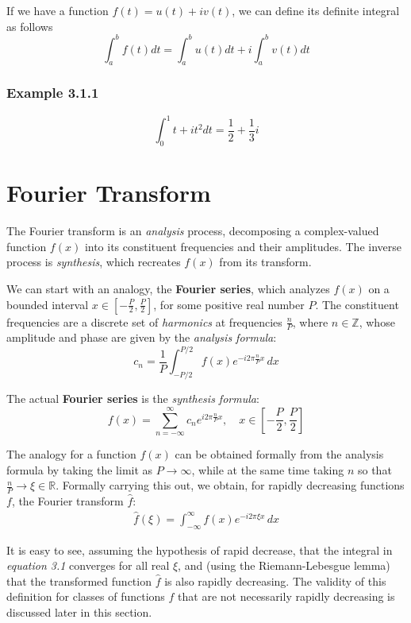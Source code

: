 \documentclass[12pt]{book}
\begin{document}
If we have a function $f(t) = u(t) + iv(t)$, we can define its definite integral as follows
\[
\int_{a}^{b} f(t) dt = \int_{a}^{b}u(t)dt + i\int_{a}^{b}v(t) dt
\]
\subsubsection{Example 3.1.1}
\[
\int_{0}^{1}t + it^2 dt = \frac{1}{2} + \frac{1}{3}i
\]
\section{Fourier Transform}
The Fourier transform is an \textit{analysis} process, decomposing a complex-valued function \( f(x) \) into its constituent frequencies and their amplitudes. The inverse process is \textit{synthesis}, which recreates \( f(x) \) from its transform.

We can start with an analogy, the \textbf{Fourier series}, which analyzes \( f(x) \) on a bounded interval \( x \in \left[-\frac{P}{2}, \frac{P}{2}\right] \), for some positive real number \( P \). The constituent frequencies are a discrete set of \textit{harmonics} at frequencies \( \frac{n}{P} \), where \( n \in \mathbb{Z} \), whose amplitude and phase are given by the \textit{analysis formula}:
\[
c_n = \frac{1}{P} \int_{-P/2}^{P/2} f(x) e^{-i 2\pi \frac{n}{P} x} \, dx
\]

The actual \textbf{Fourier series} is the \textit{synthesis formula}:
\[
f(x) = \sum_{n=-\infty}^{\infty} c_n e^{i 2\pi \frac{n}{P} x}, \quad x \in \left[-\frac{P}{2}, \frac{P}{2}\right]
\]

The analogy for a function \( f(x) \) can be obtained formally from the analysis formula by taking the limit as \( P \to \infty \), while at the same time taking \( n \) so that \( \frac{n}{P} \to \xi \in \mathbb{R} \). Formally carrying this out, we obtain, for rapidly decreasing functions \( f \), the Fourier transform \( \hat{f} \):
\begin{align}
  \hat{f}(\xi) = \int_{-\infty}^{\infty} f(x) e^{-i 2\pi \xi x} \, dx  
\end{align}

It is easy to see, assuming the hypothesis of rapid decrease, that the integral in \textit{equation 3.1} converges for all real \( \xi \), and (using the Riemann-Lebesgue lemma) that the transformed function \( \hat{f} \) is also rapidly decreasing. The validity of this definition for classes of functions \( f \) that are not necessarily rapidly decreasing is discussed later in this section.
\end{document}
